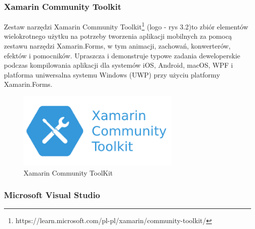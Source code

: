 \subsubsection{Xamarin Community Toolkit}

\hspace*{0.60cm}Zestaw narzędzi Xamarin Community Toolkit\footnote{https://learn.microsoft.com/pl-pl/xamarin/community-toolkit/} (logo - rys 3.2)to zbiór elementów wielokrotnego użytku na potrzeby tworzenia aplikacji mobilnych za pomocą zestawu narzędzi Xamarin.Forms, w tym animacji, zachowań, konwerterów, efektów i pomocników. Upraszcza i demonstruje typowe zadania deweloperskie podczas kompilowania aplikacji dla systemów iOS, Android, macOS, WPF i platforma uniwersalna systemu Windows (UWP) przy użyciu platformy Xamarin.Forms.

	\begin{figure}[!htb]
	\begin{center}
		\includegraphics[width=8cm]{rys/xtools.png}
		\caption{Xamarin Community ToolKit}
		\label{rys:rysunek001}
	\end{center}
\end{figure}

\subsubsection{Microsoft Visual Studio}

